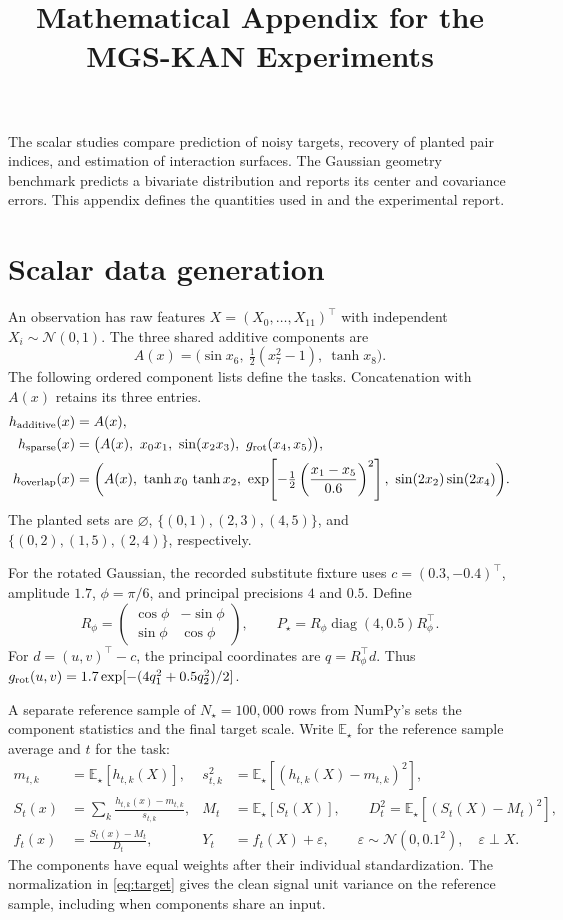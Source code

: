 \documentclass[11pt]{article}
\title{Mathematical Appendix for the MGS-KAN Experiments}
\author{}
\date{}
\let\StudyMathSection\section
\newcommand{\E}{\mathbb{E}}
\newcommand{\N}{\mathcal{N}}
\begin{document}
  \maketitle
\fi

The scalar studies compare prediction of noisy targets, recovery of planted
pair indices, and estimation of interaction surfaces. The Gaussian geometry
benchmark predicts a bivariate distribution and reports its center and
covariance errors. This appendix defines the quantities used in
 and the experimental report.

\StudyMathSection{Scalar data generation}

An observation has raw features \(X=(X_0,\ldots,X_{11})^\top\) with independent
\(X_i\sim\N(0,1)\). The three shared additive components are
\[
 A(x)=\bigl(\sin x_6,\ \tfrac12(x_7^2-1),\ \tanh x_8\bigr).
\]
The following ordered component lists define the tasks. Concatenation with
\(A(x)\) retains its three entries.
\begin{align*}
 h_{\rm additive}(x) &= A(x),\\
 h_{\rm sparse}(x) &=
 \bigl(A(x),\ x_0x_1,\ \sin(x_2x_3),\ g_{\rm rot}(x_4,x_5)\bigr),\\
 h_{\rm overlap}(x) &=
 \biggl(A(x),\ \tanh x_0\,\tanh x_2,\
 \exp\!\left[-\tfrac12\left(\frac{x_1-x_5}{0.6}\right)^2\right],\
 \sin(2x_2)\sin(2x_4)\biggr).
\end{align*}
The planted sets are \(\varnothing\), \(\{(0,1),(2,3),(4,5)\}\),
and \(\{(0,2),(1,5),(2,4)\}\), respectively.

For the rotated Gaussian, the recorded substitute fixture uses
\(c=(0.3,-0.4)^\top\), amplitude \(1.7\),
\(\phi=\pi/6\), and principal precisions \(4\) and \(0.5\). Define
\begin{equation}
 R_\phi=\begin{pmatrix}\cos\phi&-\sin\phi\\\sin\phi&\cos\phi\end{pmatrix},
 \qquad P_\star=R_\phi\operatorname{diag}(4,0.5)R_\phi^\top .
 \label{eq:rotation}
\end{equation}
For \(d=(u,v)^\top-c\), the principal coordinates are \(q=R_\phi^\top d\).
Thus \(g_{\rm rot}(u,v)=1.7\exp[-(4q_1^2+0.5q_2^2)/2]\).

A separate reference sample of \(N_\star=100{,}000\) rows from NumPy's
sets the component statistics and the final target scale. Write
\(\E_\star\) for the reference sample average and \(t\) for the task:
\begin{align}
 m_{t,k}&=\E_\star[h_{t,k}(X)],&
 s_{t,k}^2&=\E_\star[(h_{t,k}(X)-m_{t,k})^2],\nonumber\\
 S_t(x)&=\sum_k \frac{h_{t,k}(x)-m_{t,k}}{s_{t,k}},&
 M_t&=\E_\star[S_t(X)],\qquad
 D_t^2=\E_\star[(S_t(X)-M_t)^2],\nonumber\\
 f_t(x)&=\frac{S_t(x)-M_t}{D_t},&
 Y_t&=f_t(X)+\varepsilon,\qquad
 \varepsilon\sim\N(0,0.1^2),\quad \varepsilon\perp X.
 \label{eq:target}
\end{align}
The components have equal weights after their individual standardization.
The normalization in \eqref{eq:target} gives the clean signal unit variance
on the reference sample, including when components share an input.
\end{document}
